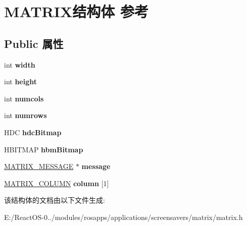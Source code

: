 \hypertarget{struct_m_a_t_r_i_x}{}\section{M\+A\+T\+R\+I\+X结构体 参考}
\label{struct_m_a_t_r_i_x}
\subsection*{Public 属性}
\begin{DoxyCompactItemize}
\item 
\mbox{\label{struct_m_a_t_r_i_x_ad32b3ceca8479e46879c1bff88088d54}} 
int {\bfseries width}
\item 
\mbox{\label{struct_m_a_t_r_i_x_aaa6479d52dc88dc4430fe28d8d1ed058}} 
int {\bfseries height}
\item 
\mbox{\label{struct_m_a_t_r_i_x_a0c697301f008ed07d493a77b1cd61531}} 
int {\bfseries numcols}
\item 
\mbox{\label{struct_m_a_t_r_i_x_ab890d81c6de9a8b1935ef71c8f66babd}} 
int {\bfseries numrows}
\item 
\mbox{\label{struct_m_a_t_r_i_x_a0c1b9a2abed75acc7cdbc7ac985a57ec}} 
H\+DC {\bfseries hdc\+Bitmap}
\item 
\mbox{\label{struct_m_a_t_r_i_x_af77684e9d21654b9c814db923ee892a2}} 
H\+B\+I\+T\+M\+AP {\bfseries hbm\+Bitmap}
\item 
\mbox{\label{struct_m_a_t_r_i_x_abc868a6f60122d1da717947c90113c97}} 
\hyperlink{struct_m_a_t_r_i_x___m_e_s_s_a_g_e}{M\+A\+T\+R\+I\+X\+\_\+\+M\+E\+S\+S\+A\+GE} $\ast$ {\bfseries message}
\item 
\mbox{\label{struct_m_a_t_r_i_x_a8462a49b651ccdf045729b4d77ee0457}} 
\hyperlink{struct_m_a_t_r_i_x___c_o_l_u_m_n}{M\+A\+T\+R\+I\+X\+\_\+\+C\+O\+L\+U\+MN} {\bfseries column} \mbox{[}1\mbox{]}
\end{DoxyCompactItemize}


该结构体的文档由以下文件生成\+:\begin{DoxyCompactItemize}
\item 
E\+:/\+React\+O\+S-\/0../modules/rosapps/applications/screensavers/matrix/matrix.\+h\end{DoxyCompactItemize}
